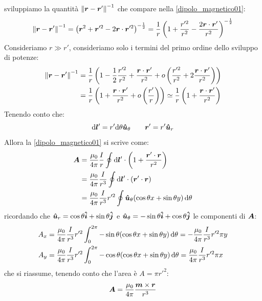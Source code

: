 sviluppiamo la quantità $\left\lVert\boldsymbol{r}-\boldsymbol{r}'\right\rVert^{-1}$ che compare nella \eqref{dipolo_magnetico01}:
\[
  \left\lVert\boldsymbol{r}-\boldsymbol{r}'\right\rVert^{-1}=\left(\boldsymbol{r}^2+\boldsymbol{r}'^2-2\boldsymbol{r}\cdot \boldsymbol{r}'^2\right)^{-\frac{1}{2}}=\frac{1}{r}\left(1+\frac{r'^2}{r^2}-\frac{2\boldsymbol{r}\cdot\boldsymbol{r}'}{r^2}\right)^{-\frac{1}{2}}
\]
Consideriamo $r\gg r'$, consideriamo solo i termini del primo ordine dello sviluppo di potenze:
\begin{equation}
  \begin{aligned}
    \left\lVert\boldsymbol{r}-\boldsymbol{r}'\right\rVert^{-1} & =\frac{1}{r}\left(1-\frac{1}{2}\frac{r'^2}{r^2}+\frac{\boldsymbol{r}\cdot\boldsymbol{r}'}{r^2}+o\left(\frac{r'^2}{r^2}+2\frac{\boldsymbol{r}\cdot\boldsymbol{r}'}{r^2}\right)\right) \\
                             & =\frac{1}{r}\left(1+\frac{\boldsymbol{r}\cdot \boldsymbol{r}'}{r^2}+o\left(\frac{r'}{r}\right)\right)\simeq\frac{1}{r}\left(1+\frac{\boldsymbol{r}\cdot \boldsymbol{r}'}{r^2}\right)
  \end{aligned}
\end{equation}
Tenendo conto che:
\begin{equation}
  \mathrm{d} \boldsymbol{l}'=r'\mathrm{d}\theta\boldsymbol{\hat {u}}_\theta \qquad \boldsymbol{r}' = r'\boldsymbol{\hat {u}}_r
\end{equation}
Allora la \eqref{dipolo_magnetico01} si scrive come:
\begin{equation}
  \begin{aligned}
    \boldsymbol{A} & = \frac{\mu_0}{4\pi}\frac{I}{r}\oint \mathrm{d}\boldsymbol{l}'\cdot\left(1+\frac{\boldsymbol{r}'\cdot \boldsymbol{r}}{r^2}\right) \\
          & = \frac{\mu_0}{4\pi}\frac{I}{r^3}\oint \mathrm{d}\boldsymbol{l}'\cdot(\boldsymbol{r}'\cdot \boldsymbol{r})                        \\
          & = \frac{\mu_0}{4\pi}\frac{I}{r^3}r'^2\oint \boldsymbol{\hat {u}}_\theta(\cos\theta x+\sin\theta y)\,\mathrm{d}\theta
  \end{aligned}
\end{equation}
ricordando che $\boldsymbol{\hat {u}}_r = \cos\theta\boldsymbol{\hat {i}}+\sin\theta\boldsymbol{\hat {j}}$ e $\boldsymbol{\hat {u}}_\theta = -\sin\theta\boldsymbol{\hat {i}}+\cos\theta\boldsymbol{\hat {j}}$ le componenti di $\boldsymbol{A}$:
\begin{equation*}
  \begin{aligned}
    A_x & = \frac{\mu_0}{4\pi}\frac{I}{r^3}r'^2\int_0^{2\pi}-\sin\theta(\cos\theta x+\sin\theta y)\,\mathrm{d}\theta=-\frac{\mu_0}{4\pi}\frac{I}{r^3}r'^2\pi y \\
    A_y & = \frac{\mu_0}{4\pi}\frac{I}{r^3}r'^2\int_0^{2\pi}-\cos\theta(\cos\theta x+\sin\theta y)\,\mathrm{d}\theta=\frac{\mu_0}{4\pi}\frac{I}{r^3}r'^2\pi x  \\
  \end{aligned}
\end{equation*}
che si riassume, tenendo conto che l'area è $A=\pi r'^2$:
\begin{equation}
  \boldsymbol{A}=\frac{\mu_0}{4\pi}\frac{\boldsymbol{m}\times\boldsymbol{r}}{r^3}
\end{equation}



